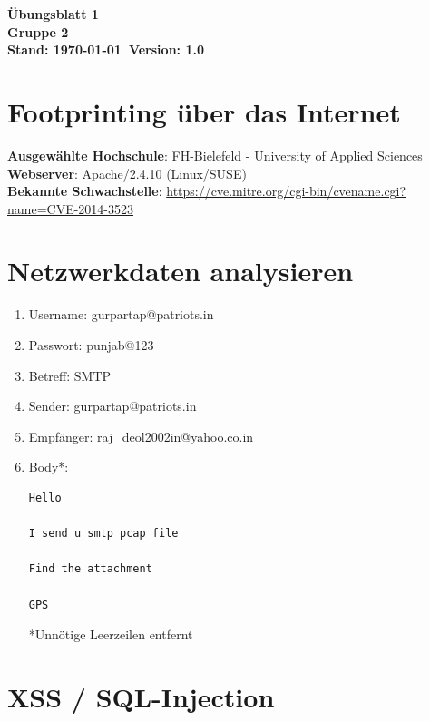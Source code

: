 \documentclass[a4paper,10pt]{article}
\newcommand{\uebungsblatt}{1} %
\newcommand{\gruppe}{2} %
\newcommand{\version}{1.0} %
\begin{document}
	
	\vspace*{1\baselineskip}
	
	\begin{center}
	    \textbf{{\large Übungsblatt \uebungsblatt} \\
		Gruppe \gruppe \\
		{\small Stand: \today \ Version: \version}}
	\end{center}

\section{Footprinting über das Internet}
 \textbf{Ausgewählte Hochschule}: FH-Bielefeld - University of Applied Sciences\\
 \textbf{Webserver}: Apache/2.4.10 (Linux/SUSE) \\
 \textbf{Bekannte Schwachstelle}: \url{https://cve.mitre.org/cgi-bin/cvename.cgi?name=CVE-2014-3523}



\section{Netzwerkdaten analysieren}
\begin{enumerate}

\item Username: gurpartap@patriots.in 
\item Passwort: punjab@123
\item Betreff: SMTP
\item Sender: gurpartap@patriots.in
\item Empfänger: raj\_deol2002in@yahoo.co.in
\item Body*:

\begin{verbatim}
Hello

I send u smtp pcap file 

Find the attachment

GPS
\end{verbatim}
*Unnötige Leerzeilen entfernt
\end{enumerate}

\section{XSS / SQL-Injection}
\end{document}
